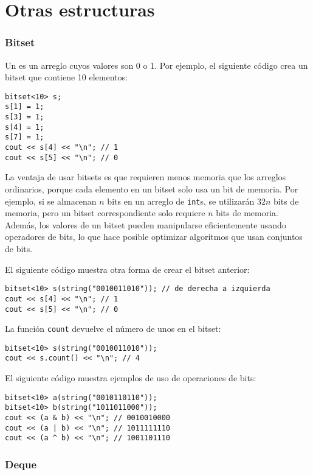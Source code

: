 \section{Otras estructuras}

\subsubsection{Bitset}


Un  es un arreglo
cuyos valores son 0 o 1.
Por ejemplo, el siguiente código crea
un bitset que contiene 10 elementos:
\begin{lstlisting}
bitset<10> s;
s[1] = 1;
s[3] = 1;
s[4] = 1;
s[7] = 1;
cout << s[4] << "\n"; // 1
cout << s[5] << "\n"; // 0
\end{lstlisting}

La ventaja de usar bitsets es que
requieren menos memoria que los arreglos ordinarios,
porque cada elemento en un bitset solo
usa un bit de memoria. Por ejemplo, si se almacenan $n$ bits en un
arreglo de \texttt{int}s, se utilizarán $32n$ bits de memoria, pero
un bitset correspondiente solo requiere $n$ bits de memoria. Además,
los valores de un bitset pueden manipularse eficientemente usando
operadores de bits, lo que hace posible
optimizar algoritmos que usan conjuntos de bits.

El siguiente código muestra otra forma de crear el bitset anterior:
\begin{lstlisting}
bitset<10> s(string("0010011010")); // de derecha a izquierda
cout << s[4] << "\n"; // 1
cout << s[5] << "\n"; // 0
\end{lstlisting}

La función \texttt{count} devuelve el número
de unos en el bitset:

\begin{lstlisting}
bitset<10> s(string("0010011010"));
cout << s.count() << "\n"; // 4
\end{lstlisting}

El siguiente código muestra ejemplos de uso de operaciones de bits:
\begin{lstlisting}
bitset<10> a(string("0010110110"));
bitset<10> b(string("1011011000"));
cout << (a & b) << "\n"; // 0010010000
cout << (a | b) << "\n"; // 1011111110
cout << (a ^ b) << "\n"; // 1001101110
\end{lstlisting}

\subsubsection{Deque}

